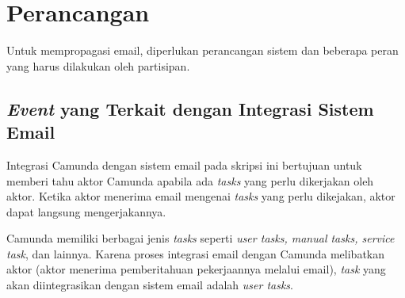 \chapter{Perancangan}
\label{chap:perancangan}
Untuk mempropagasi email, diperlukan perancangan sistem dan beberapa peran yang harus dilakukan oleh partisipan. 

\section{\textit{Event} yang Terkait dengan Integrasi Sistem Email}
\label{sec:eventUserTask}

Integrasi Camunda dengan sistem email pada skripsi ini bertujuan untuk memberi tahu aktor Camunda apabila ada \textit{tasks} yang perlu dikerjakan oleh aktor. Ketika aktor menerima email mengenai \textit{tasks} yang perlu dikejakan, aktor dapat langsung mengerjakannya. 

Camunda memiliki berbagai jenis \textit{tasks} seperti \textit{user tasks, manual tasks, service task}, dan lainnya. Karena proses integrasi email dengan Camunda melibatkan aktor (aktor menerima pemberitahuan pekerjaannya melalui email), \textit{task} yang akan diintegrasikan dengan sistem email adalah \textit{user tasks}.

